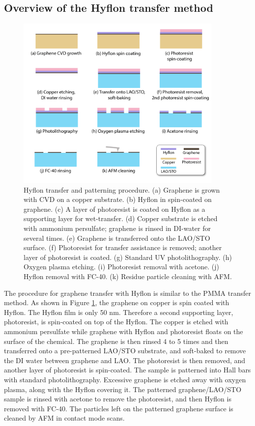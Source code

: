 \documentclass[pdflatex, sectionletters, 12pt, final, phd]{pittetd}    %
\begin{document}
\subsection{Overview of the Hyflon transfer method}

\begin{figure}[p]
	\centering
	\includegraphics[width=0.9\textwidth]{Drawing/HyflonTransfer.pdf}
	\caption[Hyflon transfer and patterning procedure]{Hyflon transfer and patterning procedure. (a) Graphene is grown with CVD on a copper substrate. (b) Hyflon in spin-coated on graphene. (c) A layer of photoresist is coated on Hyflon as a supporting layer for wet-transfer. (d) Copper substrate is etched with ammonium persulfate; graphene is rinsed in DI-water for several times. (e) Graphene is transferred onto the LAO/STO surface. (f) Photoresist for transfer assistance is removed; another layer of photoresist is coated. (g) Standard UV photolithography. (h) Oxygen plasma etching. (i) Photoresist removal with acetone. (j) Hyflon removal with FC-40. (k) Residue particle cleaning with AFM.}
	\label{FIG:HyflonTransfer}
\end{figure}

The procedure for graphene transfer with Hyflon is similar to the PMMA transfer method. As shown in Figure \ref{FIG:HyflonTransfer}, the graphene on copper is spin coated with Hyflon. The Hyflon film is only 50 nm. Therefore a second supporting layer, photoresist, is spin-coated on top of the Hyflon. The copper is etched with ammonium persulfate while graphene with Hyflon and photoresist floats on the surface of the chemical. The graphene is then rinsed 4 to 5 times and then transferred onto a pre-patterned LAO/STO substrate, and soft-baked to remove the DI water between graphene and LAO. The photoresist is then removed, and another layer of photoresist is spin-coated. The sample is patterned into Hall bars with standard photolithography. Excessive graphene is etched away with oxygen plasma, along with the Hyflon covering it. The patterned graphene/LAO/STO sample is rinsed with acetone to remove the photoresist, and then Hyflon is removed with FC-40. The particles left on the patterned graphene surface is cleaned by AFM in contact mode scans. 
\end{document}
